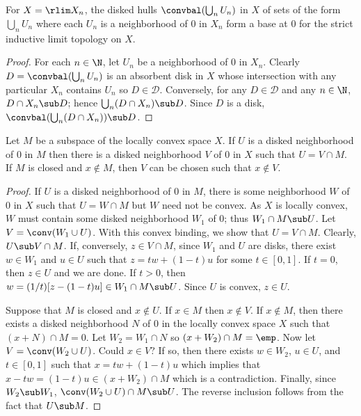 \begin{proposition}\label{LCS inductive limit base at 0}
For $X=\rlim X_n$, the disked hulls $\convbal(\bigcup_nU_n)$ in $X$ of sets of the form $\bigcup_nU_n$ where each $U_n$ is a neighborhood of $0$ in $X_n$ form a base at $0$ for the strict inductive limit topology on $X$.
\end{proposition}
\begin{proof}
For each $n\in\N$, let $U_n$ be a neighborhood of $0$ in $X_n$. Clearly $D=\convbal(\bigcup_nU_n)$ is an absorbent disk in $X$ whose intersection with any particular $X_n$ contains $U_n$ so $D\in\mathcal{D}$. Conversely, for any $D\in\mathcal{D}$ and any $n\in\N$, $D\cap X_n\sub D$; hence $\bigcup_n(D\cap X_n)\sub D$. Since $D$ is a disk, $\convbal(\bigcup_n(D\cap X_n))\sub D$.
\end{proof}
\begin{proposition}\label{LCS disked nbhd in subspace}
Let $M$ be a subspace of the locally convex space $X$. If $U$ is a disked neighborhood of $0$ in $M$ then there is a disked neighborhood $V$ of $0$ in $X$ such that $U=V\cap M$. If $M$ is closed and $x\notin M$, then $V$ can be chosen such that $x\notin V$.
\end{proposition}
\begin{proof}
If $U$ is a disked neighborhood of $0$ in $M$, there is some neighborhood $W$ of $0$ in $X$ such that $U=W\cap M$ but $W$ need not be convex. As $X$ is locally convex, $W$ must contain some disked neighborhood $W_1$ of $0$; thus $W_1\cap M\sub U$. Let $V=\conv(W_1\cup U)$. With this convex binding, we show that $U=V\cap M$. Clearly, $U\sub V\cap M$. If, conversely, $z\in V\cap M$, since $W_1$ and $U$ are disks, there exist $w\in W_1$ and $u\in U$ such that $z=tw+(1-t)u$ for some $t\in[0,1]$. If $t=0$, then $z\in U$ and we are done. If $t>0$, then $w=(1/t)[z-(1-t)u]\in W_1\cap M\sub U$. Since $U$ is convex, $z\in U$.\par
Suppose that $M$ is closed and $x\notin U$. If $x\in M$ then $x\notin V$. If $x\notin M$, then there exists a disked neighborhood $N$ of $0$ in the locally convex space $X$ such that $(x+N)\cap M=0$. Let $W_2=W_1\cap N$ so $(x+W_2)\cap M=\emp$. Now let $V=\conv(W_2\cup U)$. Could $x\in V$? If so, then there exists $w\in W_2$, $u\in U$, and $t\in[0,1]$ such that $x=tw+(1-t)u$ which implies that $x-tw=(1-t)u\in(x+W_2)\cap M$ which is a contradiction. Finally, since $W_2\sub W_1$, $\conv(W_2\cup U)\cap M\sub U$. The reverse inclusion follows from the fact that $U\sub M$.
\end{proof}
